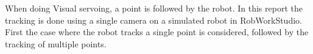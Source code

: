 When doing Visual servoing, a point is followed by the robot.
In this report the tracking is done using a single camera on a simulated robot in RobWorkStudio.
First the case where the robot tracks a single point is considered, followed by the tracking of multiple points.